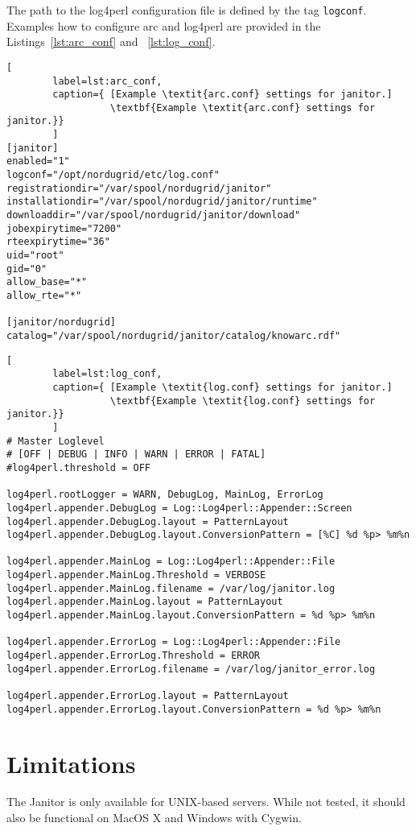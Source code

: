 The path to the log4perl configuration file is defined by the tag
\texttt{logconf}.  Examples how to configure arc and log4perl are
provided in the Listings~\ref{lst:arc_conf} and ~\ref{lst:log_conf}.

\begin{lstlisting}[
        label=lst:arc_conf,
        caption={ [Example \textit{arc.conf} settings for janitor.]
                  \textbf{Example \textit{arc.conf} settings for janitor.}}
        ]
[janitor]
enabled="1"
logconf="/opt/nordugrid/etc/log.conf"
registrationdir="/var/spool/nordugrid/janitor"
installationdir="/var/spool/nordugrid/janitor/runtime"
downloaddir="/var/spool/nordugrid/janitor/download"
jobexpirytime="7200"
rteexpirytime="36"
uid="root"
gid="0"
allow_base="*"
allow_rte="*"

[janitor/nordugrid]
catalog="/var/spool/nordugrid/janitor/catalog/knowarc.rdf"
\end{lstlisting}

\begin{lstlisting}[
        label=lst:log_conf,
        caption={ [Example \textit{log.conf} settings for janitor.]
                  \textbf{Example \textit{log.conf} settings for janitor.}}
        ]
# Master Loglevel
# [OFF | DEBUG | INFO | WARN | ERROR | FATAL]
#log4perl.threshold = OFF

log4perl.rootLogger = WARN, DebugLog, MainLog, ErrorLog
log4perl.appender.DebugLog = Log::Log4perl::Appender::Screen
log4perl.appender.DebugLog.layout = PatternLayout
log4perl.appender.DebugLog.layout.ConversionPattern = [%C] %d %p> %m%n

log4perl.appender.MainLog = Log::Log4perl::Appender::File
log4perl.appender.MainLog.Threshold = VERBOSE
log4perl.appender.MainLog.filename = /var/log/janitor.log
log4perl.appender.MainLog.layout = PatternLayout
log4perl.appender.MainLog.layout.ConversionPattern = %d %p> %m%n

log4perl.appender.ErrorLog = Log::Log4perl::Appender::File
log4perl.appender.ErrorLog.Threshold = ERROR
log4perl.appender.ErrorLog.filename = /var/log/janitor_error.log

log4perl.appender.ErrorLog.layout = PatternLayout
log4perl.appender.ErrorLog.layout.ConversionPattern = %d %p> %m%n
\end{lstlisting}



\section{Limitations}

The Janitor is only available for UNIX-based servers. While not tested,
it should also be functional on MacOS X and Windows with Cygwin.

